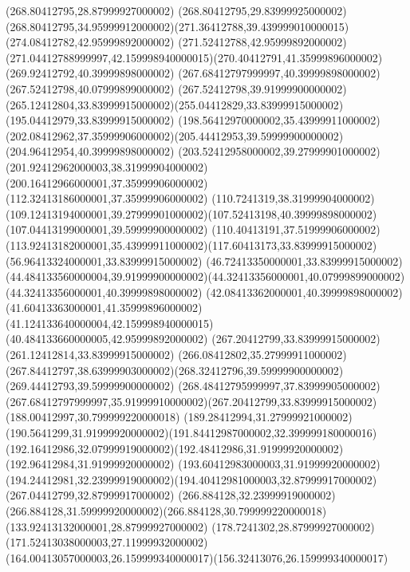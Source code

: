 {{	\lineto(268.80412795,28.87999927000002)
	\lineto(268.80412795,29.83999925000002)
	\curveto(268.80412795,34.95999912000002)(271.36412788,39.439999010000015)(274.08412782,42.95999892000002)
	\lineto(271.52412788,42.95999892000002)
	\curveto(271.04412788999997,42.159998940000015)(270.40412791,41.35999896000002)(269.92412792,40.39999898000002)
	\lineto(267.68412797999997,40.39999898000002)
	\lineto(267.52412798,40.07999899000002)
	\curveto(267.52412798,39.91999900000002)(265.12412804,33.83999915000002)(255.04412829,33.83999915000002)
	\lineto(195.04412979,33.83999915000002)
	\curveto(198.56412970000002,35.43999911000002)(202.08412962,37.35999906000002)(205.44412953,39.59999900000002)
	\lineto(204.96412954,40.39999898000002)
	\curveto(203.52412958000002,39.27999901000002)(201.92412962000003,38.31999904000002)(200.16412966000001,37.35999906000002)
	\lineto(112.32413186000001,37.35999906000002)
	\curveto(110.7241319,38.31999904000002)(109.12413194000001,39.27999901000002)(107.52413198,40.39999898000002)
	\lineto(107.04413199000001,39.59999900000002)
	\curveto(110.40413191,37.51999906000002)(113.92413182000001,35.43999911000002)(117.60413173,33.83999915000002)
	\lineto(56.96413324000001,33.83999915000002)
	\curveto(46.72413350000001,33.83999915000002)(44.484133560000004,39.91999900000002)(44.32413356000001,40.07999899000002)
	\lineto(44.32413356000001,40.39999898000002)
	\lineto(42.08413362000001,40.39999898000002)
	\curveto(41.60413363000001,41.35999896000002)(41.124133640000004,42.159998940000015)(40.484133660000005,42.95999892000002)
	\closepath
	\moveto(267.20412799,33.83999915000002)
	\lineto(261.12412814,33.83999915000002)
	\curveto(266.08412802,35.27999911000002)(267.84412797,38.63999903000002)(268.32412796,39.59999900000002)
	\lineto(269.44412793,39.59999900000002)
	\curveto(268.48412795999997,37.83999905000002)(267.68412797999997,35.91999910000002)(267.20412799,33.83999915000002)
	\closepath
	\moveto(188.00412997,30.799999220000018)
	\curveto(189.28412994,31.27999921000002)(190.5641299,31.91999920000002)(191.84412987000002,32.399999180000016)
	\curveto(192.16412986,32.07999919000002)(192.48412986,31.91999920000002)(192.96412984,31.91999920000002)
	\curveto(193.60412983000003,31.91999920000002)(194.24412981,32.23999919000002)(194.40412981000003,32.87999917000002)
	\lineto(267.04412799,32.87999917000002)
	\curveto(266.884128,32.23999919000002)(266.884128,31.59999920000002)(266.884128,30.799999220000018)
	\closepath
	\moveto(133.92413132000001,28.87999927000002)
	\lineto(178.7241302,28.87999927000002)
	\curveto(171.52413038000003,27.11999932000002)(164.00413057000003,26.159999340000017)(156.32413076,26.159999340000017)
}}
